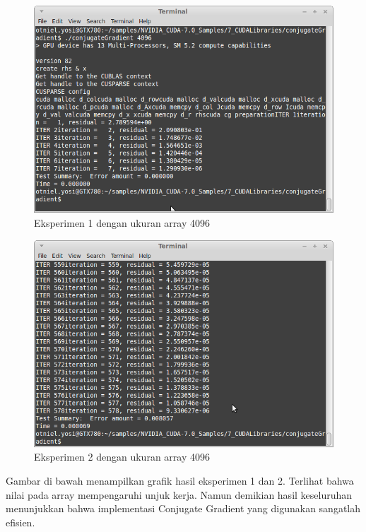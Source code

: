 \begin{figure}
	\centering
	\includegraphics[width=1\textwidth]
	{pics/cudacg_4096}
	\caption{Eksperimen 1 dengan ukuran array 4096}
	\label{fig:cgcuda1}
\end{figure}

\begin{figure}
	\centering
	\includegraphics[width=1\textwidth]
	{pics/cudacg_4096_2}
	\caption{Eksperimen 2 dengan ukuran array 4096}
	\label{fig:cgcuda2}
\end{figure}

Gambar di bawah menampilkan grafik hasil eksperimen 1 dan 2.  Terlihat bahwa nilai pada array mempengaruhi unjuk kerja.  Namun demikian hasil keseluruhan menunjukkan bahwa implementasi Conjugate Gradient yang digunakan sangatlah efisien.

